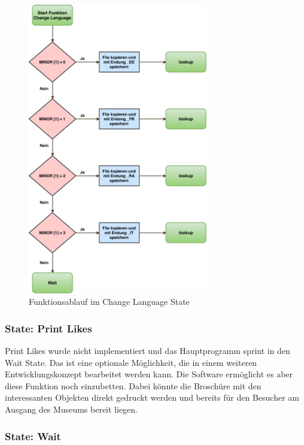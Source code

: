 \begin{figure}[htbp!!!!]
	\centering
	\includegraphics[width=0.7\textwidth]{Data/ChangeLanguage_picture.pdf}
	\caption[Statemachine: Change Language]{Funktionsablauf im Change Language State}
	\label{fig:changeLanguageState}
\end{figure} 

\subsubsection*{State: Print \glqq Likes\grqq}

Print \glqq Likes \grqq wurde nicht implementiert und das Hauptprogramm sprint in den Wait State. Das ist eine optionale Möglichkeit, die in einem weiteren Entwicklungskonzept bearbeitet werden kann. Die Software ermöglicht es aber diese Funktion noch einzubetten. Dabei könnte die Broschüre mit den interessanten Objekten direkt gedruckt werden und bereits für den Besucher am Ausgang des Museums bereit liegen.

\subsubsection*{State: Wait}

